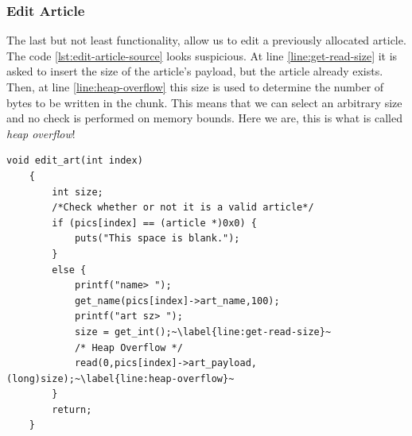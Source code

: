 \documentclass{article}
\numberwithin{equation}{subsection}
\begin{document}
\subsubsection{Edit Article}
The last but not least functionality, allow us to edit a previously allocated article. The code \ref{lst:edit-article-source} looks suspicious. At line \ref{line:get-read-size} it is asked to insert the size of the article's payload, but the article already exists. Then, at line \ref{line:heap-overflow} this size is used to determine the number of bytes to be written in the chunk. This means that we can select an arbitrary size and no check is performed on memory bounds. Here we are, this is what is called \emph{heap overflow}!\newline
\begin{minipage}{\textwidth}
\centering
\lstset{style=cstyle}
\begin{lstlisting}[caption={Edit\_article routine of asciigal source code.},captionpos=b,label={lst:edit-article-source}]
    void edit_art(int index)
	{
		int size;
        /*Check whether or not it is a valid article*/
		if (pics[index] == (article *)0x0) {
			puts("This space is blank.");
		}
		else {
			printf("name> ");
			get_name(pics[index]->art_name,100);
			printf("art sz> ");
			size = get_int();~\label{line:get-read-size}~
			/* Heap Overflow */
			read(0,pics[index]->art_payload,(long)size);~\label{line:heap-overflow}~
		}
		return;
	}
\end{lstlisting}
\end{minipage}
\end{document}
